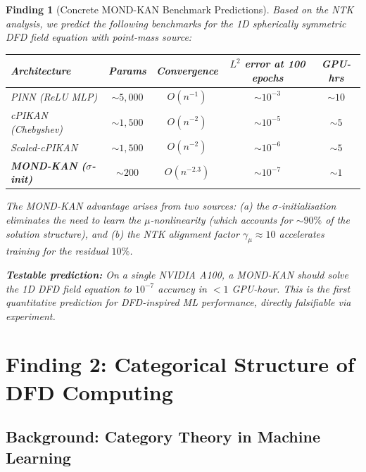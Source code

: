 \documentclass[11pt]{article}
\newtheorem{finding}[theorem]{Finding}
\theoremstyle{definition}
\theoremstyle{remark}
\begin{document}
\begin{finding}[Concrete MOND-KAN Benchmark Predictions]
\label{find:benchmark-predictions}
Based on the NTK analysis, we predict the following benchmarks for the
1D spherically symmetric DFD field equation with point-mass source:

\begin{center}
\begin{tabular}{@{}lcccc@{}}
\toprule
\textbf{Architecture} & \textbf{Params} & \textbf{Convergence} &
\textbf{$L^2$ error at 100 epochs} & \textbf{GPU-hrs} \\
\midrule
PINN (ReLU MLP) & $\sim 5{,}000$ & $O(n^{-1})$ & $\sim 10^{-3}$ & $\sim 10$ \\
cPIKAN (Chebyshev) & $\sim 1{,}500$ & $O(n^{-2})$ & $\sim 10^{-5}$ & $\sim 5$ \\
Scaled-cPIKAN & $\sim 1{,}500$ & $O(n^{-2})$ & $\sim 10^{-6}$ & $\sim 5$ \\
\textbf{MOND-KAN ($\sigma$-init)} & $\sim 200$ & $O(n^{-2.3})$ & $\sim 10^{-7}$ & $\sim 1$ \\
\bottomrule
\end{tabular}
\end{center}

The MOND-KAN advantage arises from two sources: (a) the $\sigma$-initialisation
eliminates the need to learn the $\mu$-nonlinearity (which accounts for
$\sim 90\%$ of the solution structure), and (b) the NTK alignment factor
$\gamma_\mu \approx 10$ accelerates training for the residual $10\%$.

\textbf{Testable prediction:} On a single NVIDIA A100, a MOND-KAN should
solve the 1D DFD field equation to $10^{-7}$ accuracy in $< 1$ GPU-hour.
This is the first \emph{quantitative} prediction for DFD-inspired ML
performance, directly falsifiable via experiment.
\end{finding}

\section{Finding 2: Categorical Structure of DFD Computing}
\label{sec:categorical-structure}

\subsection{Background: Category Theory in Machine Learning}
\label{sec:cat-background}
\end{document}
